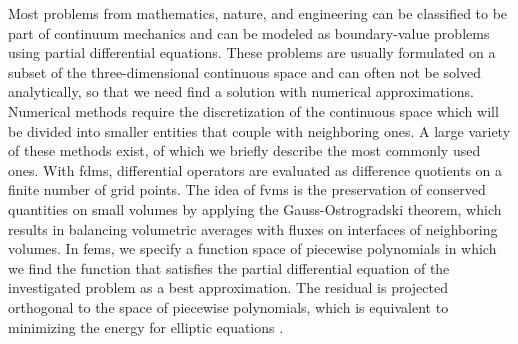 Most problems from mathematics, nature, and engineering can be classified to be part of continuum mechanics and can be modeled as boundary-value problems using partial differential equations. These problems are usually formulated on a subset of the three-dimensional continuous space and can often not be solved analytically, so that we need find a solution with numerical approximations. Numerical methods require the discretization of the continuous space which will be divided into smaller entities that couple with neighboring ones. A large variety of these methods exist, of which we briefly describe the most commonly used ones.
With \glspl{fdm}, differential operators are evaluated as difference quotients on a finite number of grid points. %
The idea of \glspl{fvm} is the preservation of conserved quantities on small volumes by applying the Gauss-Ostrogradski theorem, which results in balancing volumetric averages with fluxes on interfaces of neighboring volumes.
In \glspl{fem}, we specify a function space of piecewise polynomials in which we find the function that satisfies the partial differential equation of the investigated problem as a best approximation.
The residual is projected orthogonal to the space of piecewise polynomials, which is equivalent to minimizing the energy for elliptic equations \parencite{brenner2008}.


